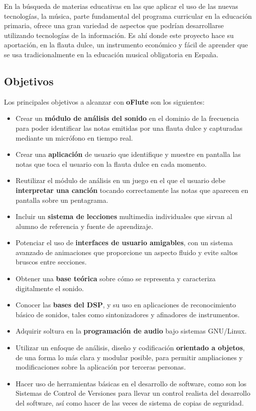 \documentclass[a4paper,11pt]{article}
\begin{document}
En la búsqueda de materias educativas en las que aplicar el uso de las nuevas
tecnologías, la música, parte fundamental del programa curricular en la
educación primaria, ofrece una gran variedad de aspectos que podrían
desarrollarse utilizando tecnologías de la información. Es ahí donde este
proyecto hace su aportación, en la flauta dulce, un instrumento económico y
fácil de aprender que se usa tradicionalmente en la educación musical
obligatoria en España.

\subsection{Objetivos}
Los principales objetivos a alcanzar con \textbf{oFlute} son los siguientes:

\begin{itemize}
\item Crear un \textbf{módulo de análisis del sonido} en el dominio de la
  frecuencia para poder identificar las notas emitidas por una flauta dulce y
  capturadas mediante un micrófono en tiempo real.
\item Crear una \textbf{aplicación} de usuario que identifique y muestre en
  pantalla las notas que toca el usuario con la flauta dulce en cada momento.
\item Reutilizar el módulo de análisis en un juego en el que el usuario debe
  \textbf{ interpretar una canción} tocando correctamente las notas que aparecen
  en pantalla sobre un pentagrama.
\item Incluir un \textbf{sistema de lecciones} multimedia individuales que
  sirvan al alumno de referencia y fuente de aprendizaje.
\item Potenciar el uso de \textbf{interfaces de usuario amigables}, con un
  sistema avanzado de animaciones que proporcione un aspecto fluido y evite
  saltos bruscos entre secciones.
\item Obtener una \textbf{base teórica} sobre cómo se representa y caracteriza
  digitalmente el sonido.
\item Conocer las \textbf{bases del DSP}, y su uso en aplicaciones de
  reconocimiento básico de sonidos, tales como sintonizadores y afinadores de
  instrumentos.
\item Adquirir soltura en la \textbf{programación de audio} bajo sistemas
  GNU/Linux.
\item Utilizar un enfoque de análisis, diseño y codificación \textbf{orientado a
    objetos}, de una forma lo más clara y modular posible, para permitir
  ampliaciones y modificaciones sobre la aplicación por terceras personas.
\item Hacer uso de herramientas básicas en el desarrollo de software, como son
  los Sistemas de Control de Versiones para llevar un control realista del
  desarrollo del software, así como hacer de las veces de sistema de copias de
  seguridad.

\end{itemize}
\end{document}
